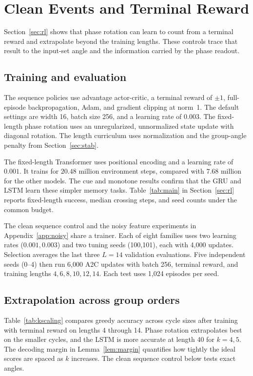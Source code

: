 \section{Clean Events and Terminal Reward}
\label{app:clean}
\label{app:additional}
Section~\ref{sec:rl} shows that phase rotation can learn to count from a
terminal reward and extrapolate beyond the training lengths. These controls
trace that result to the input-set angle and the information carried by the
phase readout.

\subsection{Training and evaluation}
\label{app:clean-training}
The sequence policies use advantage actor-critic, a terminal reward of
$\pm1$, full-episode backpropagation, Adam,
and gradient clipping at norm~1. The default settings are width 16, batch size
256, and a learning rate of $0.003$. The fixed-length phase rotation uses an
unregularized, unnormalized state update with diagonal rotation. The length
curriculum uses normalization and the group-angle penalty from
Section~\ref{sec:stab}.

The fixed-length Transformer uses positional encoding and a learning rate
of $0.001$. It trains for $20.48$ million environment steps, compared with
$7.68$ million for the other models. The cue and monotone results confirm
that the GRU and LSTM learn these simpler memory tasks.
Table~\ref{tab:main} in Section~\ref{sec:rl} reports fixed-length success,
median crossing steps, and seed counts under the common budget.
\FloatBarrier

The clean sequence control and the noisy feature experiments in
Appendix~\ref{app:noisy} share a trainer. Each of eight families uses two
learning rates ($0.001,0.003$) and two tuning seeds (100,101), each with 4,000 updates.
Selection averages the last three $L=14$ validation evaluations. Five independent
seeds (0--4) then run 6,000 A2C updates with batch 256, terminal reward,
and training lengths $4,6,8,10,12,14$. Each test uses 1,024 episodes per seed.

\subsection{Extrapolation across group orders}
\label{app:kboundary}
Table~\ref{tab:kscaling} compares greedy accuracy across cycle sizes after
training with terminal reward on lengths 4 through 14. Phase rotation
extrapolates best on the smaller cycles, and the LSTM is more accurate at
length 40 for $k=4,5$. The decoding margin in
Lemma~\ref{lem:margin} quantifies how tightly the ideal scores are spaced as
$k$ increases. The clean sequence control below tests exact angles.

